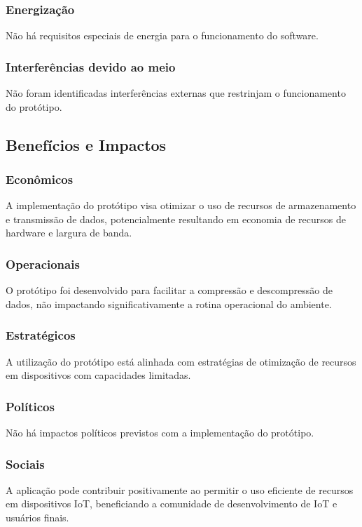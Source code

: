 \subsubsection{Energização}

Não há requisitos especiais de energia para o funcionamento do software.

\subsubsection{Interferências devido ao meio}

Não foram identificadas interferências externas que restrinjam o funcionamento do protótipo.

\subsection{Benefícios e Impactos}

\subsubsection{Econômicos}

A implementação do protótipo visa otimizar o uso de recursos de armazenamento e transmissão de dados, potencialmente resultando em economia de recursos de hardware e largura de banda.

\subsubsection{Operacionais}

O protótipo foi desenvolvido para facilitar a compressão e descompressão de dados, não impactando significativamente a rotina operacional do ambiente.

\subsubsection{Estratégicos}

A utilização do protótipo está alinhada com estratégias de otimização de recursos em dispositivos com capacidades limitadas.

\subsubsection{Políticos}

Não há impactos políticos previstos com a implementação do protótipo.

\subsubsection{Sociais}

A aplicação pode contribuir positivamente ao permitir o uso eficiente de recursos em dispositivos IoT, beneficiando a comunidade de desenvolvimento de IoT e usuários finais.
